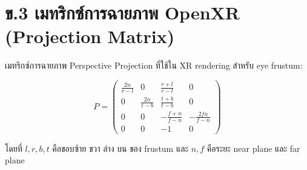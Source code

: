 \section*{ข.3 เมทริกซ์การฉายภาพ OpenXR (Projection Matrix)}

\noindent เมทริกซ์การฉายภาพ Perspective Projection ที่ใช้ใน XR rendering สำหรับ eye frustum:

\begin{equation}
P = \begin{pmatrix}
\frac{2n}{r-l} & 0 & \frac{r+l}{r-l} & 0 \\
0 & \frac{2n}{t-b} & \frac{t+b}{t-b} & 0 \\
0 & 0 & -\frac{f+n}{f-n} & -\frac{2fn}{f-n} \\
0 & 0 & -1 & 0
\end{pmatrix}
\end{equation}

โดยที่ $l, r, b, t$ คือขอบซ้าย ขวา ล่าง บน ของ frustum และ $n, f$ คือระยะ near plane และ far plane
